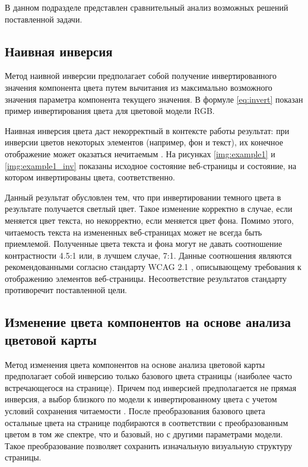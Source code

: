 В данном подразделе представлен сравнительный анализ возможных решений поставленной задачи.

\subsection{Наивная инверсия}

Метод наивной инверсии предполагает собой получение инвертированного значения компонента цвета путем вычитания из максимально возможного значения параметра компонента текущего значения. В формуле \ref{eq:invert} показан пример инвертирования цвета для цветовой модели RGB.

Наивная инверсия цвета даст некорректный в контексте работы результат: при инверсии цветов некоторых элементов (например, фон и текст), их конечное отображение может оказаться нечитаемым \cite{wcag1}. На рисунках \ref{img:example1} и \ref{img:example1_inv} показаны исходное состояние веб-страницы и состояние, на котором инвертированы цвета, соответственно.

Данный результат обусловлен тем, что при инвертировании темного цвета в результате получается светлый цвет. Такое изменение корректно в случае, если меняется цвет текста, но некорректно, если меняется цвет фона. Помимо этого, читаемость текста на измененных веб-страницах может не всегда быть приемлемой. Полученные цвета текста и фона могут не давать соотношение контрастности 4.5:1 или, в лучшем случае, 7:1. Данные соотношения являются рекомендованными согласно стандарту WCAG 2.1 \cite{wcagcontrast}, описывающему требования к отображению элементов веб-страницы. Несоответствие результатов стандарту противоречит поставленной цели.

\clearpage


\clearpage

\subsection{Изменение цвета компонентов на основе анализа цветовой карты}

Метод изменения цвета компонентов на основе анализа цветовой карты  предполагает собой инверсию только базового цвета страницы (наиболее часто встречающегося на странице). Причем под инверсией предполагается не прямая инверсия, а выбор близкого по модели к инвертированному цвета с учетом условий сохранения читаемости \cite{wcag}. После преобразования базового цвета остальные цвета на странице подбираются в соответствии с преобразованным цветом в том же спектре, что и базовый, но с другими параметрами модели. Такое преобразование позволяет сохранить изначальную визуальную структуру страницы.
 
